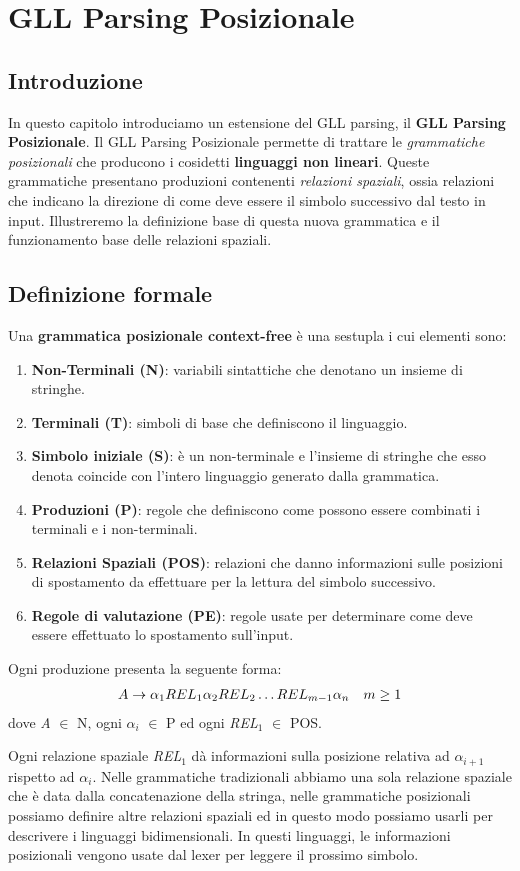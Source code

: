 \chapter{GLL Parsing Posizionale}
\section{Introduzione}
In questo capitolo introduciamo un estensione del GLL parsing, il \textbf{GLL Parsing Posizionale}. Il GLL Parsing Posizionale permette di trattare le \textit{grammatiche posizionali} che producono i cosidetti \textbf{linguaggi non lineari}. Queste grammatiche presentano produzioni contenenti \textit{relazioni spaziali}, ossia relazioni che indicano la direzione di come deve essere il simbolo successivo dal testo in input. Illustreremo la definizione base di questa nuova grammatica e il funzionamento base delle relazioni spaziali.
\section{Definizione formale}
Una \textbf{grammatica posizionale context-free} è una sestupla \cite{pubblicazione: tomita} i cui elementi sono:
\begin{enumerate}
	\item \textbf{Non-Terminali (N)}: variabili sintattiche che denotano un insieme di stringhe.
	\item \textbf{Terminali (T)}: simboli di base che definiscono il linguaggio.
	\item \textbf{Simbolo iniziale (S)}: è un non-terminale e l'insieme di stringhe che esso denota coincide con l'intero linguaggio generato dalla grammatica.
	\item \textbf{Produzioni (P)}: regole che definiscono come possono essere combinati i terminali e i non-terminali.
	\item \textbf{Relazioni Spaziali (POS)}: relazioni che danno informazioni sulle posizioni di spostamento da effettuare per la lettura del simbolo successivo.
	\item \textbf{Regole di valutazione (PE)}: regole usate per determinare come deve essere effettuato lo spostamento sull'input.
\end{enumerate}
Ogni produzione presenta la seguente forma:
\begin{align}
	A \to \alpha_{1} REL_1 \alpha_{2} REL_2 \dots REL_{m-1} \alpha_{n} \quad m \ge 1 \notag 
\end{align}
dove \textit{A} $\in$ N, ogni $\alpha_i$ $\in$ P ed ogni \textit{REL}$_1$ $\in$ POS.\par
\vspace{0.3cm}
\noindent Ogni relazione spaziale \textit{REL}$_1$ dà informazioni sulla posizione relativa ad $\alpha_{i+1}$ rispetto ad $\alpha_{i}$. Nelle grammatiche tradizionali abbiamo una sola relazione spaziale che è data dalla concatenazione della stringa, nelle grammatiche posizionali possiamo definire altre relazioni spaziali ed in questo modo possiamo usarli per descrivere i linguaggi bidimensionali. In questi linguaggi, le informazioni posizionali vengono usate dal lexer per leggere il prossimo simbolo.
